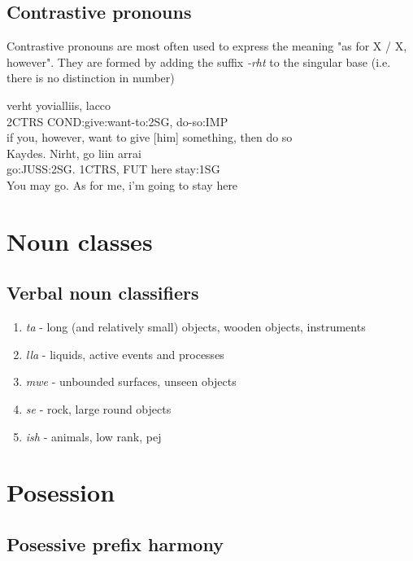 \documentclass[8pt]{book}
\begin{document}
\subsection{Contrastive pronouns}
Contrastive pronouns are most often used to express the meaning "as for X / X, however". They are formed by adding the suffix \textit{-rht} to the singular base (i.e. there is no distinction in number)

\begin{exe}
\ex
\gll verht yovialliis, lacco \\
	2CTRS  COND:give:want-to:2SG, do-so:IMP \\
	if you, however, want to give [him] something, then do so \\

\ex
\gll Kaydes. Nirht, go liin arrai \\
    go:JUSS:2SG. 1CTRS, FUT here stay:1SG \\
    You may go. As for me, i'm going to stay here \\
\end{exe}


\section{Noun classes}
\subsection{Verbal noun classifiers}

\begin{enumerate}
\item \textit{ta} - long (and relatively small) objects, wooden objects, instruments
\item \textit{lla} - liquids, active events and processes
\item \textit{mwe} - unbounded surfaces, unseen objects
\item \textit{se} - rock,  large round objects
\item \textit{ish} - animals, low rank, pej
\end{enumerate}


\section{Posession}

\subsection{Posessive prefix harmony}
\end{document}
